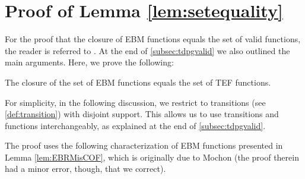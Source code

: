 \documentclass{article}
\begin{document}
 
\vspace{3em}

\appendix



\section{Proof of  Lemma \ref{lem:setequality}\label{sec:TEF-functions=00003DValid-functions=00003DclosureOfEBMfunctions}}

For the proof that the closure of EBM functions equals the set of valid functions, the reader is referred to \cite{ACG+14}. At the end of \cref{subsec:tdpgvalid} we also outlined the main arguments. Here, we prove the following:

\begin{lemma}
The closure of the set of EBM functions equals the set of TEF functions.\label{lem:closureEBMisTEF}
\end{lemma}

For simplicity, in the following discussion, we restrict to transitions (see \cref{def:transition}) with disjoint
support. This allows us to use transitions and functions interchangeably, as explained at the end of \cref{subsec:tdpgvalid}. 

The proof uses the following characterization of EBM functions presented in Lemma \ref{lem:EBRMisCOF}, which is originally due
 to Mochon \cite{Mochon07} (the proof therein had a minor
error, though, that we correct). 
\end{document}
